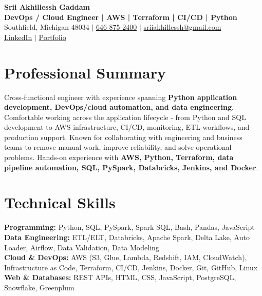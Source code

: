 \documentclass[letterpaper,10pt]{article}
\begin{document}
\fontsize{9.35pt}{10.45pt}\selectfont

\begin{center}
    {\LARGE \textbf{Srii Akhillessh Gaddam}} \\[-1pt]
    \textbf{DevOps / Cloud Engineer | AWS | Terraform | CI/CD | Python} \\[2pt]
    Southfield, Michigan 48034 $|$
    \href{tel:6468752400}{646-875-2400} $|$
    \href{mailto:sriiakhillessh@gmail.com}{sriiakhillessh@gmail.com} \\[1pt]
    \href{https://www.linkedin.com/in/srii-akhiilessh-gaddam-b48668191/}{LinkedIn} $|$
    \href{https://sriiakhillesshg.github.io/portfolio/}{Portfolio}
\end{center}
\vspace{-8pt}

\section{Professional Summary}
\small{Cross-functional engineer with experience spanning \textbf{Python application development, DevOps/cloud automation, and data engineering}. Comfortable working across the application lifecycle - from Python and SQL development to AWS infrastructure, CI/CD, monitoring, ETL workflows, and production support. Known for collaborating with engineering and business teams to remove manual work, improve reliability, and solve operational problems. Hands-on experience with \textbf{AWS, Python, Terraform, data pipeline automation, SQL, PySpark, Databricks, Jenkins, and Docker}.}

\section{Technical Skills}
\small{
\textbf{Programming:} Python, SQL, PySpark, Spark SQL, Bash, Pandas, JavaScript \\
\textbf{Data Engineering:} ETL/ELT, Databricks, Apache Spark, Delta Lake, Auto Loader, Airflow, Data Validation, Data Modeling \\
\textbf{Cloud \& DevOps:} AWS (S3, Glue, Lambda, Redshift, IAM, CloudWatch), Infrastructure as Code, Terraform, CI/CD, Jenkins, Docker, Git, GitHub, Linux \\
\textbf{Web \& Databases:} REST APIs, HTML, CSS, JavaScript, PostgreSQL, Snowflake, Greenplum
}
\end{document}
